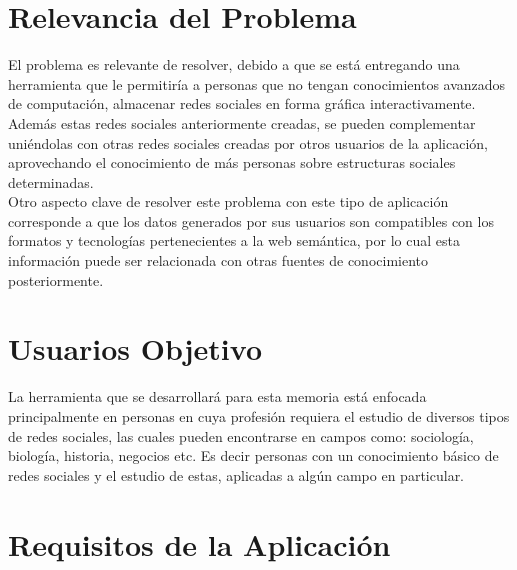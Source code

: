 \section{Relevancia del Problema} %
\label{sec:relevancia_del_problema}

El problema es relevante de resolver, debido a que se está entregando una herramienta que le permitiría a personas que no tengan conocimientos avanzados de computación, almacenar redes sociales en forma gráfica interactivamente.\\

Además estas redes sociales anteriormente creadas, se pueden complementar uniéndolas con otras redes sociales creadas por otros usuarios de la aplicación, aprovechando el conocimiento de más personas sobre estructuras sociales determinadas.\\

Otro aspecto clave de resolver este problema con este tipo de aplicación corresponde a que los datos generados por sus usuarios son compatibles con los formatos y tecnologías pertenecientes a la web semántica, por lo cual esta información puede ser relacionada con otras fuentes de conocimiento posteriormente.



% 
\section{Usuarios Objetivo} %
\label{sec:usuarios_objetivo}

La herramienta que se desarrollará para esta memoria está enfocada principalmente en personas en cuya profesión requiera el estudio de diversos tipos de redes sociales, las cuales pueden encontrarse en campos como: sociología, biología, historia, negocios etc. Es decir personas con un conocimiento básico de redes sociales y el estudio de estas, aplicadas a algún campo en particular.


\section{Requisitos de la Aplicación} %
\label{sec:requisitos_de_la_aplicacion}

% 
% 
% 
% 
% 


